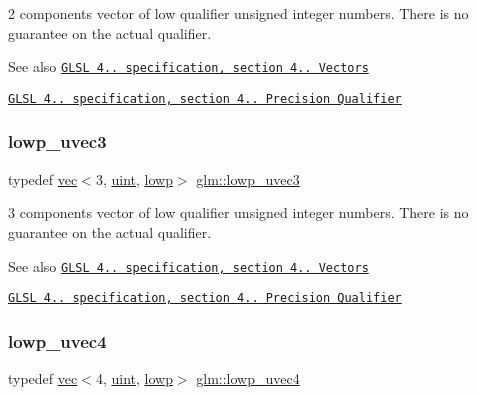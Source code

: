 2 components vector of low qualifier unsigned integer numbers. There is no guarantee on the actual qualifier.

\begin{DoxySeeAlso}{See also}
\href{http://www.opengl.org/registry/doc/GLSLangSpec.4.20.8.pdf}{\tt G\+L\+SL 4.. specification, section 4.. Vectors} 

\href{http://www.opengl.org/registry/doc/GLSLangSpec.4.20.8.pdf}{\tt G\+L\+SL 4.. specification, section 4.. Precision Qualifier} 
\end{DoxySeeAlso}
\mbox{\label{group__core__precision_gab06a83e99d38e15a3e54d38208b9deba}} 
\subsubsection{\texorpdfstring{lowp\+\_\+uvec3}{lowp\_uvec3}}
{\footnotesize\ttfamily typedef \hyperlink{structglm_1_1vec}{vec}$<$3, \hyperlink{group__core__precision_ga4fd29415871152bfb5abd588334147c8}{uint}, \hyperlink{namespaceglm_a36ed105b07c7746804d7fdc7cc90ff25ae161af3fc695e696ce3bf69f7332bc2d}{lowp}$>$ \hyperlink{group__core__precision_gab06a83e99d38e15a3e54d38208b9deba}{glm\+::lowp\+\_\+uvec3}}

3 components vector of low qualifier unsigned integer numbers. There is no guarantee on the actual qualifier.

\begin{DoxySeeAlso}{See also}
\href{http://www.opengl.org/registry/doc/GLSLangSpec.4.20.8.pdf}{\tt G\+L\+SL 4.. specification, section 4.. Vectors} 

\href{http://www.opengl.org/registry/doc/GLSLangSpec.4.20.8.pdf}{\tt G\+L\+SL 4.. specification, section 4.. Precision Qualifier} 
\end{DoxySeeAlso}
\mbox{\label{group__core__precision_ga0ecd5668a8e001e14a9dab2cffd09285}} 
\subsubsection{\texorpdfstring{lowp\+\_\+uvec4}{lowp\_uvec4}}
{\footnotesize\ttfamily typedef \hyperlink{structglm_1_1vec}{vec}$<$4, \hyperlink{group__core__precision_ga4fd29415871152bfb5abd588334147c8}{uint}, \hyperlink{namespaceglm_a36ed105b07c7746804d7fdc7cc90ff25ae161af3fc695e696ce3bf69f7332bc2d}{lowp}$>$ \hyperlink{group__core__precision_ga0ecd5668a8e001e14a9dab2cffd09285}{glm\+::lowp\+\_\+uvec4}}

